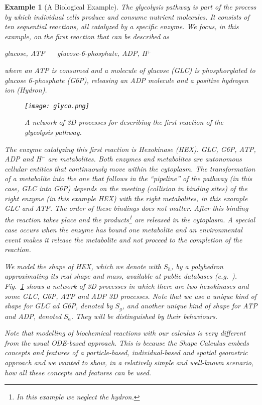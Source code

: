 \documentclass[11pt]{article}
\newtheorem{example}{Example}
\begin{document}
\begin{example}[A Biological Example]
\label{sec:example}
The \emph{glycolysis} pathway is part of the process by which individual cells produce and consume
nutrient molecules. It consists of ten sequential reactions, all catalyzed by a specific enzyme. We focus, in this example, on the first reaction that can be described as

\emph{glucose, ATP  \,\, \ce {<=>} \,\, glucose-6-phosphate, ADP, H$^{+}$}

\noindent where an ATP is consumed and a molecule of glucose (GLC) is phosphorylated to glucose 6-phosphate (G6P), releasing an ADP molecule and a positive hydrogen ion (Hydron).

\begin{figure}[tbh]
\begin{center}
\texttt{[image: glyco.png]}
\end{center}
\caption{A network of 3D processes for describing the first reaction of the glycolysis pathway.}
\label{fig:glyco}
\end{figure}

The enzyme catalyzing this first reaction is \emph{Hexokinase} (HEX). GLC, G6P, ATP, ADP and H${^+}$ are metabolites. Both enzymes and metabolites are autonomous cellular entities that continuously move within the cytoplasm. The transformation of a metabolite into the one that follows in the ``pipeline'' of the pathway (in this case, GLC into G6P) depends on the meeting (collision in binding sites) of the right enzyme (in this example HEX) with the right metabolites, in this example GLC and ATP. The order of these bindings does not matter. After this binding the reaction takes place and the products\footnote{In this example we neglect the hydron.} are released in the cytoplasm. A special case occurs when the enzyme has bound one metabolite and an environmental event makes it release the metabolite and not proceed to the completion of the reaction.

We model the shape of HEX, which we denote with $S_h$, by a polyhedron approximating its real shape and mass, available at public databases (e.g.\ \cite{PDB}). Fig.~\ref{fig:glyco} shows a network of 3D processes in which there are two hexokinases and some GLC, G6P, ATP and ADP 3D processes. Note that we use a unique kind of shape for GLC ad G6P, denoted by $S_g$, and another unique kind of shape for ATP and ADP, denoted $S_a$. They will be distinguished by their behaviours.

Note that modelling of biochemical reactions with our calculus is very different from the usual ODE-based approach. This is because the Shape Calculus embeds concepts and features of a particle-based, individual-based and spatial geometric approach and we wanted to show, in a relatively simple and well-known scenario, how all these concepts and features can be used.
\end{example}
\end{document}
